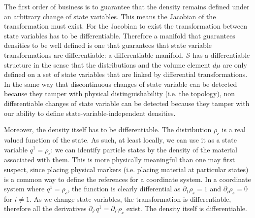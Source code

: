 \documentclass[aps,pra,10pt,twocolumn,floatfix,nofootinbib]{revtex4-1}
\numberwithin{equation}{section}
\theoremstyle{definition}
\begin{document}
The first order of business is to guarantee that the density remains defined under an arbitrary change of state variables. This means the Jacobian of the transformation must exist. For the Jacobian to exist the transformation between state variables has to be differentiable. Therefore a manifold that guarantees densities to be well defined is one that guarantees that state variable transformations are differentiable: a differentiable manifold. $\mathcal{S}$ has a differentiable structure in the sense that the distributions and the volume element $d\mu$ are only defined on a set of state variables that are linked by differential transformations. In the same way that discontinuous changes of state variable can be detected because they tamper with physical distinguishability (i.e. the topology), non differentiable changes of state variable can be detected because they tamper with our ability to define state-variable-independent densities.

Moreover, the density itself has to be differentiable. The distribution $\rho_\mathcal{c}$ is a real valued function of the state. As such, at least locally, we can use it as a state variable $q^1=\rho_\mathcal{c}$: we can identify particle states by the density of the material associated with them. This is more physically meaningful than one may first suspect, since placing physical markers (i.e. placing material at particular states) is a common way to define the references for a coordinate system. In a coordinate system where $q^1=\rho_\mathcal{c}$, the function is clearly differential as $\partial_1 \rho_\mathcal{c} = 1$ and $\partial_i \rho_\mathcal{c} = 0$ for $i \neq 1$. As we change state variables, the transformation is differentiable, therefore all the derivatives $\partial_{i'} q^1 = \partial_{i'} \rho_\mathcal{c}$ exist. The density itself is differentiable.
\end{document}
